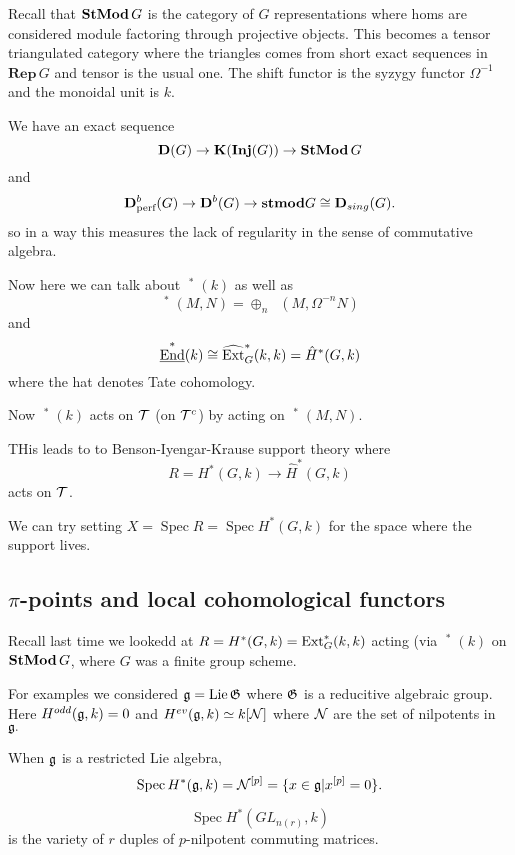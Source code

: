 \documentclass[12pt]{article}
\DeclareMathOperator{\Spec}{Spec}
\newcommand{\Rep}{\mathbf{Rep}\,}
\DeclareMathOperator{\uHom}{\underline{Hom}}
\DeclareMathOperator{\uEnd}{\underline{End}}
\begin{document}
Recall that $\operatorname{\mathbf{StMod}} G$ is the category of $G$ representations where homs are considered module factoring through projective objects. This becomes a tensor triangulated category 
where the triangles comes from short exact sequences in $\Rep G$ and tensor is the usual one. The shift functor is the syzygy functor $\Omega^{-1}$ and the monoidal unit is $k$.

\begin{rmk}
	We have an exact sequence 
	\[\mathbf{D}(G)\to \mathbf{K}(\mathbf{Inj}(G))\to\operatorname{\mathbf{StMod}} G\]
	and 
	\[\mathbf{D}^b_{\text{perf}}(G)\to \mathbf{D}^b(G)\to\mathbf{stmod} G\cong\mathbf{D}_{sing}(G).\]
	so in a way this measures the lack of regularity in the sense of commutative algebra.
\end{rmk}

Now here we can talk about $\uEnd^\ast(k)$ as well as 
\[\uHom^\ast(M,N)=\oplus_n\uHom(M,\Omega^{-n}N)\]
and 
\[\uEnd^\ast(k)\cong\widehat\Ext_G^\ast(k,k)=\hat H^\ast(G,k)\]
where the hat denotes Tate cohomology.

Now $\uEnd^\ast(k)$ acts on $\mathcal{T}$ (on $\mathcal{T}^c$) by acting on $\uHom^\ast(M,N)$.

THis leads to to Benson-Iyengar-Krause support theory where 
\[R=H^\ast(G,k)\to\hat H^\ast(G,k)\]
acts on $\mathcal{T}$.

We can try setting $X=\Spec R=\Spec H^\ast(G,k)$ for the space where the support lives.

\subsection{\texorpdfstring{$\pi$}{pi}-points and local cohomological functors}
Recall last time we lookedd at $R=H^\ast(G,k)=\operatorname{Ext}_G^\ast(k,k)$ acting (via $\uEnd^\ast(k)$ on $\operatorname{\mathbf{StMod}} G$, where $G$ was a finite group scheme.

For examples we considered $\mathfrak{g}=\operatorname{Lie}\mathfrak{G}$ where $\mathfrak{G}$ is a reducitive algebraic group. Here 
$H^{odd}(\mathfrak{g},k)=0$ and $H^{ev}(\mathfrak{g},k)\simeq k[\mathcal{N}]$ where $\mathcal{N}$ are the set of nilpotents in $\mathfrak{g}.$

\begin{thm}
	When $\mathfrak{g}$ is a restricted Lie algebra,
	\[\Spec H^\ast(\frakg,k)=\calN^{[p]}=\{x\in\frakg|x^{[p]}=0\}.\]
\end{thm}
\begin{thm}
	\[\Spec H^\ast(GL_{n(r)},k)\]
	is the variety of $r$ duples of $p$-nilpotent commuting matrices.
\end{thm}
\end{document}
